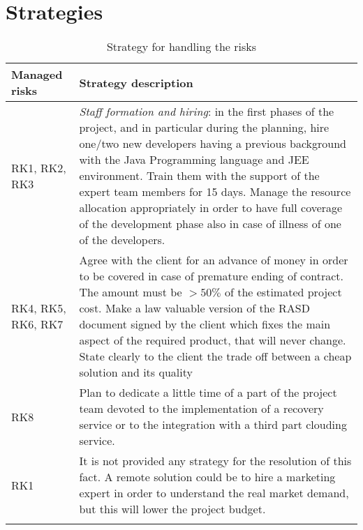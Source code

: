 \section{Strategies}
\begin{longtable}{p{} | p{}}
\textbf{Managed risks} & \textbf{Strategy description} \\ \hline
RK1, RK2, RK3 & \textit{Staff formation and hiring}: in the first phases of the project, and in particular during the planning, hire one/two new developers having a previous background with the Java Programming language and JEE environment. Train them with the support of the expert team members for 15 days. Manage the resource allocation appropriately in order to have full coverage of the development phase also in case of illness of one of the developers. \\ \hline
RK4, RK5, RK6, RK7& Agree with the client for an advance of money in order to be covered in case of premature ending of contract. The amount must be $>50\%$ of the estimated project cost. Make a law valuable version of the RASD document signed by the client which fixes the main aspect of the required product, that will never change. State clearly to the client the trade off between a cheap solution and its quality \\ \hline
RK8 & Plan to dedicate a little time of a part of the project team devoted to the implementation of a recovery service or to the integration with a third part clouding service. \\ \hline
RK1 & It is not provided any strategy for the resolution of this fact. A remote solution could be to hire a marketing expert in order to understand the real market demand, but this will lower the project budget.\\
\caption{Strategy for handling the risks}
\end{longtable}
